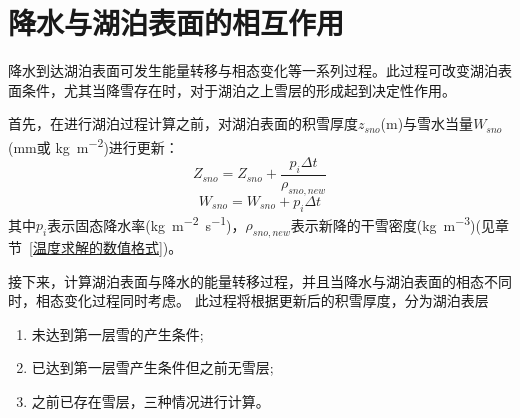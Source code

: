 \section{降水与湖泊表面的相互作用}
降水到达湖泊表面可发生能量转移与相态变化等一系列过程。此过程可改变湖泊表面条件，尤其当降雪存在时，对于湖泊之上雪层的形成起到决定性作用。


首先，在进行湖泊过程计算之前，对湖泊表面的积雪厚度$z_{sno}$(m)与雪水当量$W_{sno}$(mm或 \unit{kg.m^{-2}})进行更新：
\begin{equation}
Z_{sno}=Z_{sno}+\frac{p_{i} \Delta t}{\rho_{sno,new}}
\end{equation}
\begin{equation}
W_{sno}=W_{sno}+p_{i} \Delta t
\end{equation}
其中$p_i$表示固态降水率(\unit{kg.m^{-2}.s^{-1}})，$\rho_{sno,new}$表示新降的干雪密度(\unit{kg.m^{-3}})(见章节~\ref{温度求解的数值格式})。

接下来，计算湖泊表面与降水的能量转移过程，并且当降水与湖泊表面的相态不同时，相态变化过程同时考虑。
此过程将根据更新后的积雪厚度，分为湖泊表层
\begin{enumerate}
    \item 未达到第一层雪的产生条件;
    \item 已达到第一层雪产生条件但之前无雪层;
    \item 之前已存在雪层，三种情况进行计算。
\end{enumerate}

